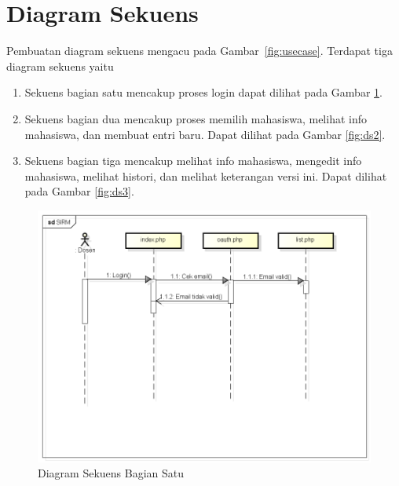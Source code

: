 \section{Diagram Sekuens}
\label{sec:diagramsekuens}

Pembuatan diagram sekuens mengacu pada Gambar~\ref{fig:usecase}. Terdapat
tiga diagram sekuens yaitu 
\begin{enumerate}[(1)]
  \item Sekuens bagian satu mencakup proses login dapat dilihat pada Gambar
  \ref{fig:ds1}.
  \item Sekuens bagian dua mencakup proses memilih mahasiswa, melihat
  info mahasiswa, dan membuat entri baru. Dapat dilihat pada Gambar \ref{fig:ds2}.
  \item Sekuens bagian tiga mencakup melihat info mahasiswa, mengedit info
  mahasiswa, melihat histori, dan melihat keterangan versi ini.
  Dapat dilihat pada Gambar \ref{fig:ds3}.
\end{enumerate}

\begin{figure}[H]
\centering
\includegraphics[scale=0.5]{Gambar/sekuenslogin.png}
\caption[Diagram Sekuens Bagian Satu]{Diagram Sekuens Bagian Satu} 
\label{fig:ds1}
\end{figure}

